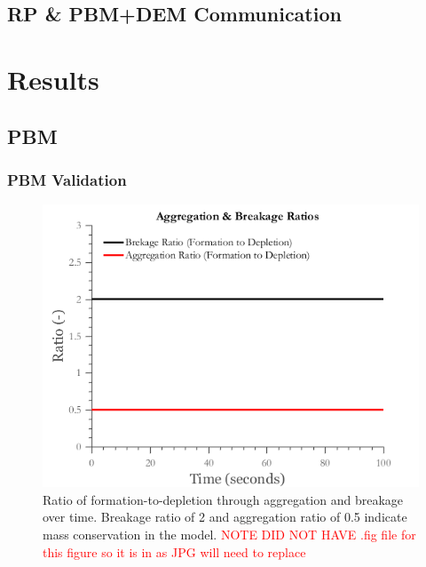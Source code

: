 \documentclass[preprint,11pt,authoryear]{elsarticle}
\begin{document}
  
  \subsection{RP \& PBM+DEM Communication}


  
\section{Results}
  \subsection{PBM}
    \subsubsection{PBM Validation}
      

      \begin{figure}[H]
      \centering
      \includegraphics[scale=0.5]{rslts_anik_pbm_ratios}
      \caption{Ratio of formation-to-depletion through aggregation and breakage over time. Breakage ratio of 2 and aggregation ratio of 0.5 indicate mass conservation in the model. \textcolor{red}{NOTE DID NOT HAVE .fig file for this figure so it is in as JPG will need to replace} }
      \label{fig:rslts_anik_pbm_ratios}
      \end{figure}
     
\end{document}

